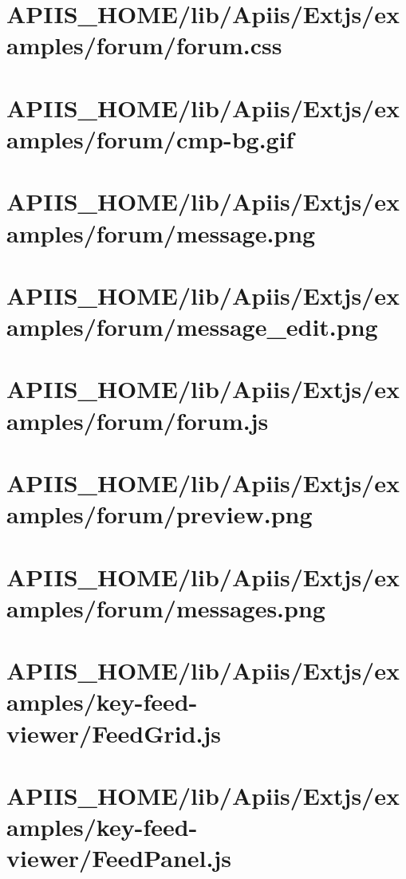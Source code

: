 \section{APIIS\_HOME/lib/Apiis/Extjs/examples/forum/forum.css} 
\section{APIIS\_HOME/lib/Apiis/Extjs/examples/forum/cmp-bg.gif} 
\section{APIIS\_HOME/lib/Apiis/Extjs/examples/forum/message.png} 
\section{APIIS\_HOME/lib/Apiis/Extjs/examples/forum/message\_edit.png} 
\section{APIIS\_HOME/lib/Apiis/Extjs/examples/forum/forum.js} 
\section{APIIS\_HOME/lib/Apiis/Extjs/examples/forum/preview.png} 
\section{APIIS\_HOME/lib/Apiis/Extjs/examples/forum/messages.png} 
\section{APIIS\_HOME/lib/Apiis/Extjs/examples/key-feed-viewer/FeedGrid.js} 
\section{APIIS\_HOME/lib/Apiis/Extjs/examples/key-feed-viewer/FeedPanel.js} 
